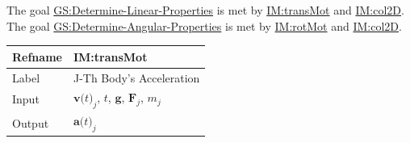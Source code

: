 \documentclass[12pt]{article}
\begin{document}
The goal \hyperref[linearGS]{GS:Determine-Linear-Properties} is met by \hyperref[IM:transMot]{IM:transMot} and \hyperref[IM:col2D]{IM:col2D}. The goal \hyperref[angularGS]{GS:Determine-Angular-Properties} is met by \hyperref[IM:rotMot]{IM:rotMot} and \hyperref[IM:col2D]{IM:col2D}.

\vspace{\baselineskip}
\noindent
\begin{minipage}{\textwidth}
\begin{tabular}{>{\raggedright}p{}>{\raggedright\arraybackslash}p{}}
\toprule \textbf{Refname} & \textbf{IM:transMot}
\label{IM:transMot}
\\ \midrule
Label & J-Th Body's Acceleration
        
\\ \midrule
Input & ${\symbf{v}\text{(}t\text{)}_{j}}$, $t$, $\symbf{g}$, ${\symbf{F}_{j}}$, ${m_{j}}$
        
\\ \midrule
Output & ${\symbf{a}\text{(}t\text{)}_{j}}$
         

\end{tabular}
\end{minipage}
\end{document}
